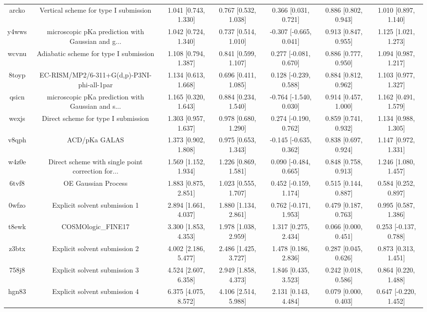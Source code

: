 \documentclass{article}
\begin{document}
\begin{center}
\begin{longtable}{|ccccccc|}
 arcko &              Vertical scheme for type I submission &  1.041 [0.743, 1.330] &  0.767 [0.532, 1.038] &     0.366 [0.031, 0.721] &  0.886 [0.802, 0.943] &   1.010 [0.897, 1.140] \\
 y4wws &  microscopic pKa prediction with Gaussian and g... &  1.042 [0.724, 1.340] &  0.737 [0.514, 1.010] &   -0.307 [-0.665, 0.041] &  0.913 [0.847, 0.955] &   1.125 [1.021, 1.273] \\
 wcvnu &             Adiabatic scheme for type I submission &  1.108 [0.794, 1.387] &  0.841 [0.599, 1.107] &    0.277 [-0.081, 0.670] &  0.886 [0.777, 0.950] &   1.094 [0.987, 1.217] \\
 8toyp &         EC-RISM/MP2/6-311+G(d,p)-P3NI-phi-all-1par &  1.134 [0.613, 1.668] &  0.696 [0.411, 1.085] &    0.128 [-0.239, 0.588] &  0.884 [0.812, 0.962] &   1.103 [0.977, 1.327] \\
 qsicn &  microscopic pKa prediction with Gaussian and s... &  1.165 [0.320, 1.643] &  0.884 [0.234, 1.540] &   -0.764 [-1.540, 0.030] &  0.914 [0.457, 1.000] &   1.162 [0.491, 1.579] \\
 wexjs &                Direct scheme for type I submission &  1.303 [0.957, 1.637] &  0.978 [0.680, 1.290] &    0.274 [-0.190, 0.762] &  0.859 [0.741, 0.932] &   1.134 [0.988, 1.305] \\
 v8qph &                                      ACD/pKa GALAS &  1.373 [0.902, 1.808] &  0.975 [0.653, 1.343] &   -0.145 [-0.635, 0.362] &  0.838 [0.697, 0.924] &   1.147 [0.972, 1.331] \\
 w4z0e &  Direct scheme with single point correction for... &  1.569 [1.152, 1.934] &  1.226 [0.869, 1.581] &    0.090 [-0.484, 0.665] &  0.848 [0.758, 0.913] &   1.246 [1.080, 1.457] \\
 6tvf8 &                                OE Gaussian Process &  1.883 [0.875, 2.851] &  1.023 [0.555, 1.707] &    0.452 [-0.159, 1.174] &  0.515 [0.144, 0.887] &   0.584 [0.252, 0.897] \\
 0wfzo &                      Explicit solvent submission 1 &  2.894 [1.661, 4.037] &  1.880 [1.134, 2.861] &    0.762 [-0.171, 1.953] &  0.479 [0.187, 0.763] &   0.995 [0.587, 1.386] \\
 t8ewk &                                 COSMOlogic\_FINE17 &  3.300 [1.853, 4.353] &  1.978 [1.038, 2.959] &     1.317 [0.275, 2.434] &  0.066 [0.000, 0.451] &  0.253 [-0.137, 0.788] \\
 z3btx &                      Explicit solvent submission 2 &  4.002 [2.186, 5.477] &  2.486 [1.425, 3.727] &     1.478 [0.186, 2.836] &  0.287 [0.045, 0.626] &   0.873 [0.313, 1.451] \\
 758j8 &                      Explicit solvent submission 3 &  4.524 [2.607, 6.358] &  2.949 [1.858, 4.373] &     1.846 [0.435, 3.523] &  0.242 [0.018, 0.586] &   0.864 [0.220, 1.488] \\
 hgn83 &                      Explicit solvent submission 4 &  6.375 [4.075, 8.572] &  4.106 [2.514, 5.988] &     2.131 [0.143, 4.484] &  0.079 [0.000, 0.403] &  0.647 [-0.220, 1.452] \\
\end{longtable}
\end{center}
\end{document}
